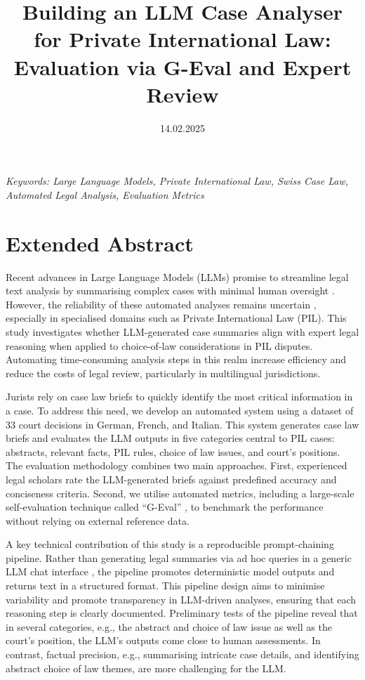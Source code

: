 \documentclass[a4paper,12pt]{article}
\title{Building an LLM Case Analyser for Private International Law: Evaluation via G-Eval and Expert Review}
\date{14.02.2025}
\begin{document}
\maketitle
\thispagestyle{fancy}

\begin{center}
\textit{Keywords: Large Language Models, Private International Law, Swiss Case Law, Automated Legal Analysis, Evaluation Metrics}
\newline
\end{center}

\section*{Extended Abstract}

Recent advances in Large Language Models (LLMs) promise to streamline legal text analysis by summarising complex cases with minimal human oversight \parencite{pereira_inacia_2024}. However, the reliability of these automated analyses remains uncertain \parencite{deroy_applicability_2024}, especially in specialised domains such as Private International Law (PIL). This study investigates whether LLM-generated case summaries align with expert legal reasoning when applied to choice-of-law considerations in PIL disputes. Automating time-consuming analysis steps in this realm increase efficiency and reduce the costs of legal review, particularly in multilingual jurisdictions.

Jurists rely on case law briefs to quickly identify the most critical information in a case. To address this need, we develop an automated system using a dataset of 33 court decisions in German, French, and Italian. This system generates case law briefs and evaluates the LLM outputs in five categories central to PIL cases: abstracts, relevant facts, PIL rules, choice of law issues, and court's positions. The evaluation methodology combines two main approaches. First, experienced legal scholars rate the LLM-generated briefs against predefined accuracy and conciseness criteria. Second, we utilise automated metrics, including a large-scale self-evaluation technique called ``G-Eval'' \parencite{liu2023gevalnlgevaluationusing}, to benchmark the performance without relying on external reference data.

A key technical contribution of this study is a reproducible prompt-chaining pipeline. Rather than generating legal summaries via ad hoc queries in a generic LLM chat interface \parencite{qin_is_2023}, the pipeline promotes deterministic model outputs \parencite{atil2024llmstabilitydetailedanalysis} and returns text in a structured format. This pipeline design aims to minimise variability and promote transparency in LLM-driven analyses, ensuring that each reasoning step is clearly documented. Preliminary tests of the pipeline reveal that in several categories, e.g., the abstract and choice of law issue as well as the court's position, the LLM's outputs come close to human assessments. In contrast, factual precision, e.g., summarising intricate case details, and identifying abstract choice of law themes, are more challenging for the LLM.
\end{document}
